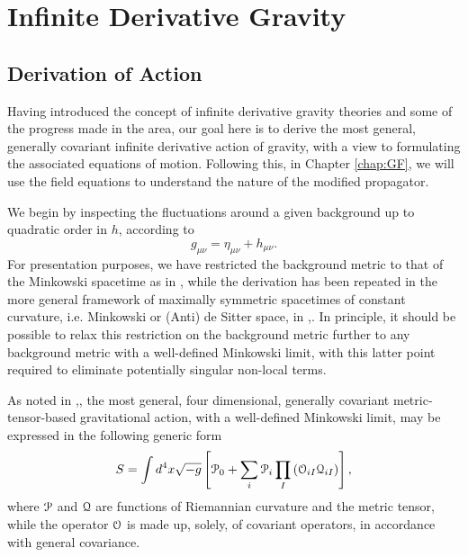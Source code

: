\chapter{Infinite Derivative Gravity}
\label{chap:2}
\section{Derivation of Action}
Having introduced the concept of infinite derivative gravity theories and some of the progress made in the area, our goal here is to derive the most general, generally covariant infinite derivative action of gravity, with a view to formulating the associated equations of motion. Following this, in Chapter \ref{chap:GF}, we will use the field equations to understand the nature of the modified propagator. 

We begin by inspecting the fluctuations around a given background up to quadratic order in $h$, according to
\[
\label{d0}
g_{\mu\nu}=\eta_{\mu\nu}+h_{\mu\nu}
.\]
For presentation purposes, we have restricted the background metric to that of the Minkowski spacetime as in \cite{Biswas:2011ar}, while the derivation has been repeated in the more general framework of maximally symmetric spacetimes of constant curvature, i.e. Minkowski or (Anti) de Sitter space, in \cite{Biswas:2016egy},\cite{Biswas:2016etb}.  In principle, it should be possible to relax this restriction on the background metric further to any background metric with a well-defined Minkowski limit, with this latter point required to eliminate potentially singular non-local terms. 

As noted in \cite{Biswas:2013kla},\cite{Biswas:2011ar}, the most general, four dimensional, generally covariant metric-tensor-based gravitational action, with a well-defined Minkowski limit, may be expressed in the following generic form
\[
\label{d1}
S=\int d^4 x\sqrt{-g}\left[{\cal P}_0+\sum_i {\cal P}_i \prod_I \left( {\cal O}_{iI}{\cal Q}_{iI}\right)\right]
,\]
where ${\cal P}$ and ${\cal Q}$ are functions of Riemannian curvature and the metric tensor, while the operator ${\cal O}$ is made up, solely, of covariant operators, in accordance with general covariance.

